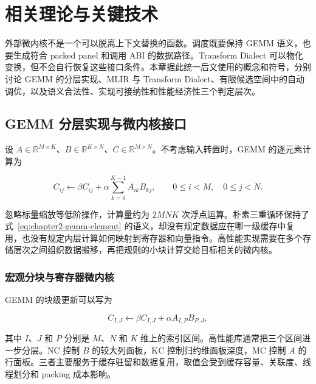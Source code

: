 
\chapter{相关理论与关键技术}
\label{chap:background}

外部微内核不是一个可以脱离上下文替换的函数。调度既要保持 GEMM 语义，也要生成符合 packed panel 和调用 ABI 的数据路径。Transform Dialect 可以物化变换，但不会自行恢复这些接口条件。本章据此统一后文使用的概念和符号，分别讨论 GEMM 的分层实现、MLIR 与 Transform Dialect、有限候选空间中的自动调优，以及语义合法性、实现可接纳性和性能经济性三个判定层次。

\section{GEMM 分层实现与微内核接口}

设 $A\in\mathbb{R}^{M\times K}$、$B\in\mathbb{R}^{K\times N}$、$C\in\mathbb{R}^{M\times N}$。不考虑输入转置时，GEMM 的逐元素计算为

\begin{equation}
C_{ij}
\leftarrow
\beta C_{ij}
+
\alpha\sum_{k=0}^{K-1}A_{ik}B_{kj},
\qquad
0\leq i<M,\quad 0\leq j<N .
\label{eq:chapter2-gemm-element}
\end{equation}

忽略标量缩放等低阶操作，计算量约为 $2MNK$ 次浮点运算。朴素三重循环保持了式~\eqref{eq:chapter2-gemm-element} 的语义，却没有规定数据应在哪一级缓存中复用，也没有规定内层计算如何映射到寄存器和向量指令。高性能实现需要在多个存储层次之间组织数据搬移，再把规则的小块计算交给目标相关的微内核\cite{Dongarra1990Level3,Goto2008Anatomy}。

\subsection{宏观分块与寄存器微内核}

GEMM 的块级更新可以写为

\begin{equation}
C_{I,J}
\leftarrow
\beta C_{I,J}
+
\alpha A_{I,P}B_{P,J},
\label{eq:chapter2-block-update}
\end{equation}

其中 $I$、$J$ 和 $P$ 分别是 $M$、$N$ 和 $K$ 维上的索引区间。高性能库通常把三个区间进一步分层。$\mathrm{NC}$ 控制 $B$ 的较大列面板，$\mathrm{KC}$ 控制归约维面板深度，$\mathrm{MC}$ 控制 $A$ 的行面板。三者主要服务于缓存驻留和数据复用，取值会受到缓存容量、关联度、线程划分和 packing 成本影响\cite{Goto2008Anatomy,VanZee2015BLIS}。

